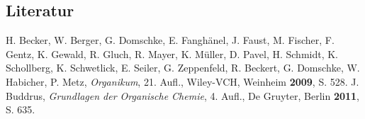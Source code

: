 \documentclass[12pt]{article}
\begin{document}
\begin{onehalfspace}
\section{Literatur}
\renewcommand{\section}[2]{}%
\begin{thebibliography}{}
H. Becker, W. Berger, G. Domschke, E. Fanghänel, J. Faust, M. Fischer, F. Gentz, K. Gewald, R. Gluch, R. Mayer, K. Müller, D. Pavel, H. Schmidt, K. Schollberg, K. Schwetlick, E. Seiler, G. Zeppenfeld, R. Beckert, G. Domschke, W. Habicher, P. Metz, \textit{Organikum}, 21. Aufl., Wiley-VCH, Weinheim \textbf{2009}, S. 528. 
J. Buddrus, \textit{Grundlagen der Organische Chemie}, 4. Aufl., De Gruyter, Berlin \textbf{2011}, S. 635.
\end{thebibliography}
\end{onehalfspace}
\end{document}
